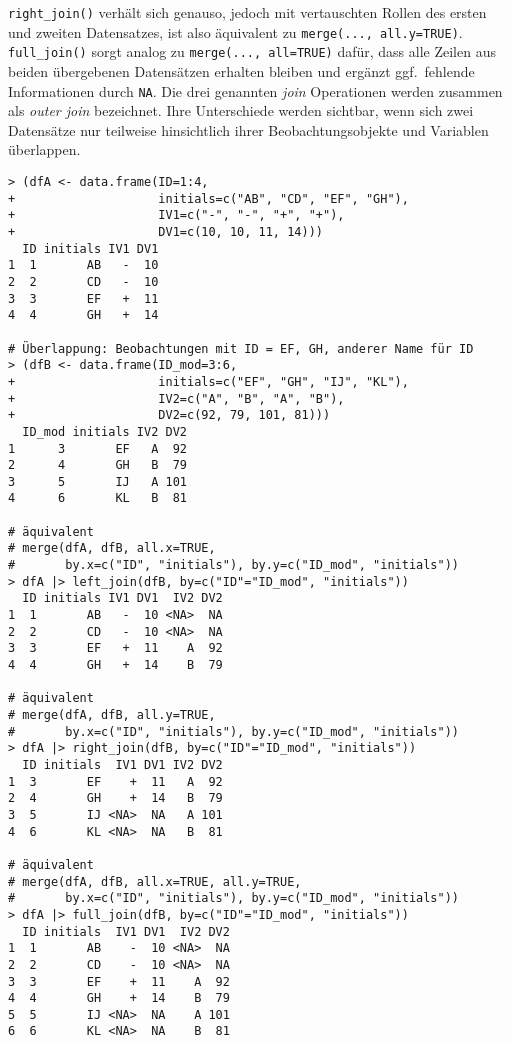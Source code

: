 \lstinline!right_join()! verhält sich genauso, jedoch mit vertauschten Rollen des ersten und zweiten Datensatzes, ist also äquivalent zu \lstinline!merge(..., all.y=TRUE)!. \lstinline!full_join()! sorgt analog zu \lstinline!merge(..., all=TRUE)! dafür, dass alle Zeilen aus beiden übergebenen Datensätzen erhalten bleiben und ergänzt ggf.\ fehlende Informationen durch \lstinline!NA!. Die drei genannten \emph{join} Operationen werden zusammen als \emph{outer join} bezeichnet. Ihre Unterschiede werden sichtbar, wenn sich zwei Datensätze nur teilweise hinsichtlich ihrer Beobachtungsobjekte und Variablen überlappen.
\begin{lstlisting}
> (dfA <- data.frame(ID=1:4,
+                    initials=c("AB", "CD", "EF", "GH"),
+                    IV1=c("-", "-", "+", "+"),
+                    DV1=c(10, 10, 11, 14)))
  ID initials IV1 DV1
1  1       AB   -  10
2  2       CD   -  10
3  3       EF   +  11
4  4       GH   +  14

# Überlappung: Beobachtungen mit ID = EF, GH, anderer Name für ID
> (dfB <- data.frame(ID_mod=3:6,
+                    initials=c("EF", "GH", "IJ", "KL"),
+                    IV2=c("A", "B", "A", "B"),
+                    DV2=c(92, 79, 101, 81)))
  ID_mod initials IV2 DV2
1      3       EF   A  92
2      4       GH   B  79
3      5       IJ   A 101
4      6       KL   B  81

# äquivalent
# merge(dfA, dfB, all.x=TRUE,
#       by.x=c("ID", "initials"), by.y=c("ID_mod", "initials"))
> dfA |> left_join(dfB, by=c("ID"="ID_mod", "initials"))
  ID initials IV1 DV1  IV2 DV2
1  1       AB   -  10 <NA>  NA
2  2       CD   -  10 <NA>  NA
3  3       EF   +  11    A  92
4  4       GH   +  14    B  79

# äquivalent
# merge(dfA, dfB, all.y=TRUE,
#       by.x=c("ID", "initials"), by.y=c("ID_mod", "initials"))
> dfA |> right_join(dfB, by=c("ID"="ID_mod", "initials"))
  ID initials  IV1 DV1 IV2 DV2
1  3       EF    +  11   A  92
2  4       GH    +  14   B  79
3  5       IJ <NA>  NA   A 101
4  6       KL <NA>  NA   B  81

# äquivalent
# merge(dfA, dfB, all.x=TRUE, all.y=TRUE,
#       by.x=c("ID", "initials"), by.y=c("ID_mod", "initials"))
> dfA |> full_join(dfB, by=c("ID"="ID_mod", "initials"))
  ID initials  IV1 DV1  IV2 DV2
1  1       AB    -  10 <NA>  NA
2  2       CD    -  10 <NA>  NA
3  3       EF    +  11    A  92
4  4       GH    +  14    B  79
5  5       IJ <NA>  NA    A 101
6  6       KL <NA>  NA    B  81
\end{lstlisting}

